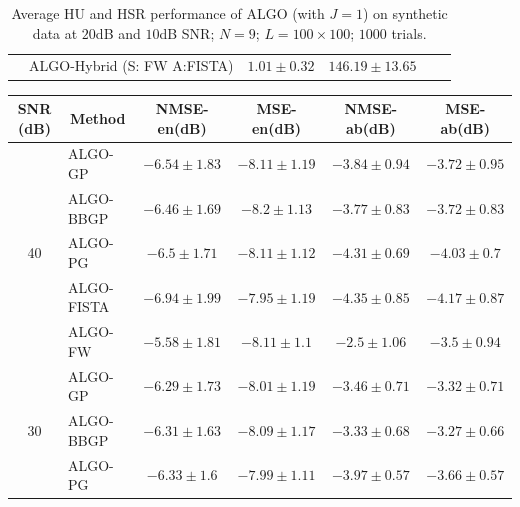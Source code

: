 \begin{table}[h]
\begin{adjustbox}{max width=\textwidth}
\begin{tabular}{|c|l|c|c|c|c|}
                    & ALGO-Hybrid (S: FW A:FISTA)& $1.01     \pm 0.32$   & $146.19   \pm 13.65$   \tabularnewline \cline{1-4}
\end{tabular}
\end{adjustbox}
\caption{Average HU and HSR performance of ALGO (with $J=1$) on synthetic
         data at $20$dB and $10$dB SNR; $N = 9$; $L = 100 \times 100$; $1000$
         trials.}
\label{table:results_full_MO9_SNR2010dB_J1}
\end{table}

\newpage

\begin{table}[h]
\centering
\begin{adjustbox}{max width=\textwidth}
\begin{tabular}{|c|l|c|c|c|c|}
\hline
SNR (dB)            & \multicolumn{1}{c|}{Method}       & NMSE-en(dB)         & MSE-en(dB)          & NMSE-ab(dB)         & MSE-ab(dB)          \tabularnewline \hline
\multirow{5}{*}{40} & ALGO-GP                    & $-6.54    \pm 1.83$ & $-8.11    \pm 1.19$ & $-3.84    \pm 0.94$ & $-3.72    \pm 0.95$ \tabularnewline
                    & ALGO-BBGP                  & $-6.46    \pm 1.69$ & $-8.2     \pm 1.13$ & $-3.77    \pm 0.83$ & $-3.72    \pm 0.83$ \tabularnewline
                    & ALGO-PG                    & $-6.5     \pm 1.71$ & $-8.11    \pm 1.12$ & $-4.31    \pm 0.69$ & $-4.03    \pm 0.7$  \tabularnewline
                    & ALGO-FISTA                 & $-6.94    \pm 1.99$ & $-7.95    \pm 1.19$ & $-4.35    \pm 0.85$ & $-4.17    \pm 0.87$ \tabularnewline
                    & ALGO-FW                    & $-5.58    \pm 1.81$ & $-8.11    \pm 1.1$  & $-2.5     \pm 1.06$ & $-3.5     \pm 0.94$ \tabularnewline \hline
\multirow{5}{*}{30} & ALGO-GP                    & $-6.29    \pm 1.73$ & $-8.01    \pm 1.19$ & $-3.46    \pm 0.71$ & $-3.32    \pm 0.71$ \tabularnewline
                    & ALGO-BBGP                  & $-6.31    \pm 1.63$ & $-8.09    \pm 1.17$ & $-3.33    \pm 0.68$ & $-3.27    \pm 0.66$ \tabularnewline
                    & ALGO-PG                    & $-6.33    \pm 1.6$  & $-7.99    \pm 1.11$ & $-3.97    \pm 0.57$ & $-3.66    \pm 0.57$ \tabularnewline

\end{tabular}
\end{adjustbox}
\end{table}
